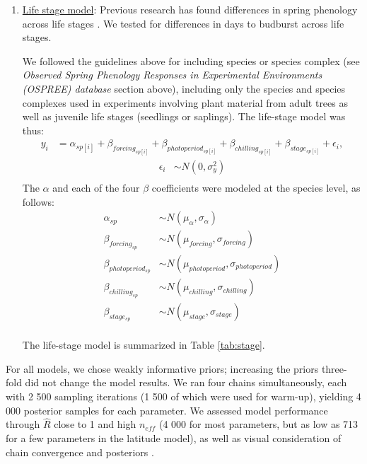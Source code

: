 \documentclass{article}
\begin{document}
\begin{enumerate}
\item \underline{Life stage model}:
Previous research has found differences in spring phenology across life stages \emph{\citep[e.g.{\normalfont, juvenile versus adult trees}][]{vitasse2013ont}}. We tested for differences in days to budburst across life stages. 
\par We followed the guidelines above for including species or species complex (see \emph{Observed Spring Phenology Responses in Experimental Environments (OSPREE) database} section above), including only the species and species complexes used in experiments involving plant material from adult trees as well as juvenile life stages (seedlings or saplings). The life-stage model was thus:
\begin{align*}
y_i &= \alpha_{sp[i]} + \beta_{forcing_{sp[i]}} + \beta_{photoperiod_{sp[i]}} + \beta_{chilling_{sp[i]}} + \beta_{stage_{sp[i]}} + \epsilon_{i},
\end{align*}
\begin{align*}
\epsilon_i & \sim N(0,\sigma^2_y) \\
\end{align*}
\noindent The $\alpha$ and each of the four $\beta$ coefficients were modeled at the species level, as follows:
\begin{align*}
\alpha_{sp} & \sim N(\mu_{\alpha}, \sigma_{\alpha}) \\
\beta_{forcing_{sp}} & \sim N(\mu_{forcing}, \sigma_{forcing}) \\
\beta_{photoperiod_{sp}} & \sim N(\mu_{photoperiod}, \sigma_{photoperiod})\\
\beta_{chilling_{sp}} & \sim N(\mu_{chilling}, \sigma_{chilling})\\
\beta_{stage_{sp}} & \sim N(\mu_{stage}, \sigma_{stage})\\
\end{align*}
\par The life-stage model is summarized in Table \ref{tab:stage}.

\end{enumerate}
\noindent For all models, we chose weakly informative priors; increasing the priors three-fold did not change the model results. We ran four chains simultaneously, each with 2 500 sampling iterations (1 500 of which were used for warm-up), yielding 4 000 posterior samples for each parameter. We assessed model performance through $\hat{R}$ close to 1 and high $n_{eff}$ (4 000 for most parameters, but as low as 713 for a few parameters in the latitude model), as well as visual consideration of chain convergence and posteriors \emph{\citep{BDA}}. 
\end{document}
